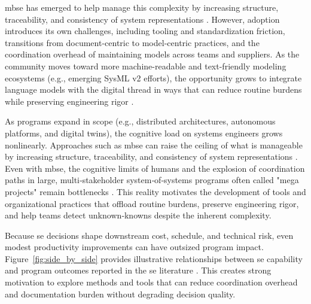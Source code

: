 \ac{mbse} has emerged to help manage this complexity by increasing structure, traceability, and consistency of system representations \cite{dau_ModelBasedSystemsEngineering_2019, ramos_ModelBasedSystemsEngineering_2012, borky_EffectiveModelBasedSystems_2018, vaneman_mbse_demystified_2025, delligatti_SysMLDistilledBrief_2013}. However,  adoption introduces its own challenges, including tooling and standardization friction, transitions from document-centric to model-centric practices, and the coordination overhead of maintaining models across teams and suppliers. As the community moves toward more machine-readable and text-friendly modeling ecosystems (e.g., emerging SysML v2 efforts), the opportunity grows to integrate language models with the digital thread in ways that can reduce routine burdens while preserving engineering rigor \cite{friedenthal_MovingForwardSysMLV2_2024}.

As programs expand in scope (e.g., distributed architectures, autonomous platforms, and digital twins), the cognitive load on systems engineers grows nonlinearly. Approaches such as \ac{mbse} can raise the ceiling of what is manageable by increasing structure, traceability, and consistency of system representations \cite{dau_ModelBasedSystemsEngineering_2019, ramos_ModelBasedSystemsEngineering_2012, borky_EffectiveModelBasedSystems_2018, vaneman_mbse_demystified_2025, delligatti_SysMLDistilledBrief_2013}. Even with \ac{mbse}, the cognitive limits of humans and the explosion of coordination paths in large, multi‑stakeholder system‑of‑systems programs often called "mega projects" remain bottlenecks \cite{McDermott_Generative_AI_Visualization_Managing_Megaprojects_2025}. This reality motivates the development of tools and organizational practices that offload routine burdens, preserve engineering rigor, and help teams detect unknown‑knowns despite the inherent complexity.

Because \ac{se} decisions shape downstream cost, schedule, and technical risk, even modest productivity improvements can have outsized program impact. Figure~\ref{fig:side_by_side} provides illustrative relationships between \ac{se} capability and program outcomes reported in the \ac{se} literature \cite{honour_value_systems_engineering_2012, walden_systems_engineering_handbook_2015, elm_BusinessCaseSystemsEngineering_2012}. This creates strong motivation to explore methods and tools that can reduce coordination overhead and documentation burden without degrading decision quality.


